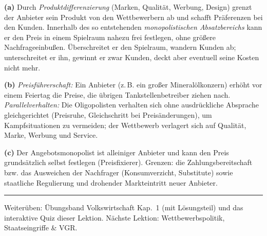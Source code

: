 \documentclass[11pt, a4paper]{article}
\begin{document}
\begin{loesung}[title={Lösung Aufgabe~9 --- Unvollständige Konkurrenz}]
\textbf{(a)} Durch \emph{Produktdifferenzierung} (Marken, Qualität, Werbung, Design) grenzt
der Anbieter sein Produkt von den Wettbewerbern ab und schafft Präferenzen bei den Kunden.
Innerhalb des so entstehenden \emph{monopolistischen Absatzbereichs} kann er den Preis in
einem Spielraum nahezu frei festlegen, ohne größere Nachfrageeinbußen. Überschreitet er den
Spielraum, wandern Kunden ab; unterschreitet er ihn, gewinnt er zwar Kunden, deckt aber
eventuell seine Kosten nicht mehr.

\textbf{(b)} \emph{Preisführerschaft:} Ein Anbieter (z.\,B. ein großer Mineralölkonzern)
erhöht vor einem Feiertag die Preise, die übrigen Tankstellenbetreiber ziehen nach.
\emph{Parallelverhalten:} Die Oligopolisten verhalten sich ohne ausdrückliche Absprache
gleichgerichtet (Preisruhe, Gleichschritt bei Preisänderungen), um Kampfsituationen zu
vermeiden; der Wettbewerb verlagert sich auf Qualität, Marke, Werbung und Service.

\textbf{(c)} Der Angebotsmonopolist ist alleiniger Anbieter und kann den Preis grundsätzlich
selbst festlegen (Preisfixierer). Grenzen: die Zahlungsbereitschaft bzw. das Ausweichen der
Nachfrager (Konsumverzicht, Substitute) sowie staatliche Regulierung und drohender
Markteintritt neuer Anbieter.
\end{loesung}

\vspace{1em}
\hrule
\vspace{0.8em}
\noindent\textsf{\small Weiterüben: Übungsband Volkswirtschaft Kap.~1 (mit Lösungsteil) und das
interaktive Quiz dieser Lektion. Nächste Lektion: Wettbewerbspolitik, Staatseingriffe \& VGR.}
\end{document}
